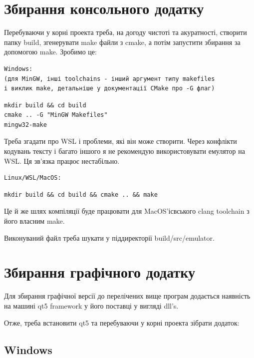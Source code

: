 \documentclass[oneside,final,14pt]{extreport}
\begin{document}
\section{Збирання консольного додатку}
Перебуваючи у корні проекта треба, на догоду чистоті та акуратності, створити папку build, згенерувати make файли з cmake, а потім запустити збирання за допомогою make.
Зробимо це:
\begin{verbatim}
Windows:
(для MinGW, інші toolchains - інший аргумент типу makefiles 
і виклик make, детальніше у документації CMake про -G флаг)
\end{verbatim}
\begin{tcolorbox}
\begin{verbatim}
mkdir build && cd build
cmake .. -G "MinGW Makefiles"
mingw32-make
\end{verbatim}
\end{tcolorbox}

Треба згадати про WSL і проблеми, які він може створити. Через конфлікти кодувань тексту і багато іншого я не рекомендую використовувати емулятор на WSL. Ця зв'язка працює нестабільно.

\begin{verbatim}
Linux/WSL/MacOS:
\end{verbatim}
\begin{tcolorbox}
\begin{verbatim}
mkdir build && cd build && cmake .. && make
\end{verbatim}
\end{tcolorbox}

Це й же шлях компіляції буде працювати для MacOS'ісвського clang toolchain з його власним make.

Виконуваний файл треба шукати у піддиректорії build/src/emulator.

\section{Збирання графічного додатку}

Для збирання графічної версії до перелічених вище програм додається наявність на машині qt5 framework у його поставці у вигляді dll's.

Отже, треба встановити qt5 та перебуваючи у корні проекта зібрати додаток:


\subsection{Windows}
\end{document}
